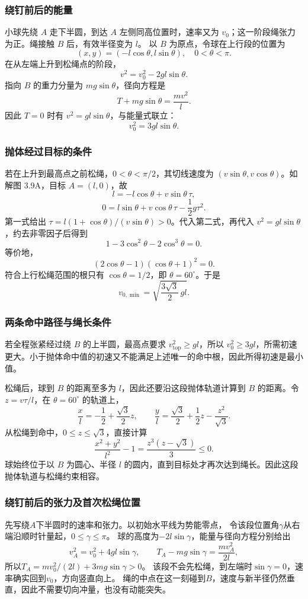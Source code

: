 \documentclass[UTF8,fontset=fandol,a4paper,11pt]{ctexart}
\begin{document}
\subsubsection*{绕钉前后的能量}
小球先绕 $A$ 走下半圆，到达 $A$ 左侧同高位置时，速率又为 $v_0$；这一阶段绳张力为正。绳接触 $B$ 后，有效半径变为 $l$。
以 $B$ 为原点，令球在上行段的位置为
\[
(x,y)=(-l\cos\theta,l\sin\theta),\quad 0<\theta<\pi.
\]
在从左端上升到松绳点的阶段，
\[
v^2=v_0^2-2gl\sin\theta.
\]
指向 $B$ 的重力分量为 $mg\sin\theta$，径向方程是
\[
T+mg\sin\theta=\frac{mv^2}{l}.
\]
因此 $T=0$ 时有 $v^2=gl\sin\theta$，与能量式联立：
\[
v_0^2=3gl\sin\theta.
\]

\subsubsection*{抛体经过目标的条件}
若在上升到最高点之前松绳，$0<\theta<\pi/2$，其切线速度为 $(v\sin\theta,v\cos\theta)$。如解图 3.9A，目标 $A=(l,0)$，故
\[
l=-l\cos\theta+v\sin\theta\,\tau,
\]
\[
0=l\sin\theta+v\cos\theta\,\tau-\frac12g\tau^2.
\]
第一式给出 $\tau=l(1+\cos\theta)/(v\sin\theta)>0$。代入第二式，再代入 $v^2=gl\sin\theta$，约去非零因子后得到
\[
1-3\cos^2\theta-2\cos^3\theta=0.
\]
等价地，
\[
(2\cos\theta-1)(\cos\theta+1)^2=0.
\]
符合上行松绳范围的根只有 $\cos\theta=1/2$，即 $\theta=60^\circ$。于是
\[
\boxed{v_{0,\min}=\sqrt{\frac{3\sqrt3}{2}\,gl}}.
\]

\subsubsection*{两条命中路径与绳长条件}
若全程张紧经过绕 $B$ 的上半圆，最高点要求 $v_{\mathrm{top}}^2\geq gl$，所以 $v_0^2\geq3gl$，所需初速更大。小于抛体命中值的初速又不能满足上述唯一的命中根，因此所得初速是最小值。

松绳后，球到 $B$ 的距离至多为 $l$，因此还要沿这段抛体轨道计算到 $B$ 的距离。令 $z=v\tau/l$，在 $\theta=60^\circ$ 的轨道上，
\[
\frac{x}{l}=-\frac12+\frac{\sqrt3}{2}z,\qquad
\frac{y}{l}=\frac{\sqrt3}{2}+\frac12z-\frac{z^2}{\sqrt3}.
\]
从松绳到命中，$0\leq z\leq\sqrt3$，直接计算
\[
\frac{x^2+y^2}{l^2}-1=\frac{z^3(z-\sqrt3)}3\leq0.
\]
球始终位于以 $B$ 为圆心、半径 $l$ 的圆内，直到目标处才再次达到绳长。因此这段抛体轨道与松绳约束相容。
\subsubsection*{绕钉前后的张力及首次松绳位置}
先写绕$A$下半圆时的速率和张力。以初始水平线为势能零点，
令该段位置角$\gamma$从右端沿顺时针量起，$0\leq\gamma\leq\pi$。
球的高度为$-2l\sin\gamma$，能量与径向方程分别给出
\[
v_A^2=v_0^2+4gl\sin\gamma,
\qquad T_A-mg\sin\gamma=\frac{mv_A^2}{2l},
\]
所以$T_A=mv_0^2/(2l)+3mg\sin\gamma>0$。
该段不会先松绳，到左端时$\sin\gamma=0$，速率确实回到$v_0$，方向竖直向上。
绳的中点在这一刻碰到$B$，速度与新半径仍然垂直，因此不需要切向冲量，也没有动能突失。
\end{document}
